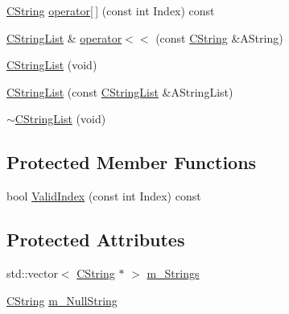 \begin{DoxyCompactItemize}
\item 
\hyperlink{classCString}{C\-String} \hyperlink{classCStringList_a8bdb9a9ae1b232214241eb3f4658bbeb}{operator\mbox{[}$\,$\mbox{]}} (const int Index) const 
\item 
\hyperlink{classCStringList}{C\-String\-List} \& \hyperlink{classCStringList_ac7af08bd93a1d622379f5e9dc54329a1}{operator$<$$<$} (const \hyperlink{classCString}{C\-String} \&A\-String)
\item 
\hyperlink{classCStringList_ac9d2195d4f6e0fa08488cb1ab98a236e}{C\-String\-List} (void)
\item 
\hyperlink{classCStringList_aa1cc8d6d2e1138e2734556e45257614d}{C\-String\-List} (const \hyperlink{classCStringList}{C\-String\-List} \&A\-String\-List)
\item 
\hyperlink{classCStringList_aa7c3df28564109982e37b0fa2d908672}{$\sim$\-C\-String\-List} (void)
\end{DoxyCompactItemize}
\subsection*{Protected Member Functions}
\begin{DoxyCompactItemize}
\item 
bool \hyperlink{classCStringList_ab98413493b1f07399ec8721db6d57389}{Valid\-Index} (const int Index) const 
\end{DoxyCompactItemize}
\subsection*{Protected Attributes}
\begin{DoxyCompactItemize}
\item 
std\-::vector$<$ \hyperlink{classCString}{C\-String} $\ast$ $>$ \hyperlink{classCStringList_a60e983669566a41d76a98122b7e9e7af}{m\-\_\-\-Strings}
\item 
\hyperlink{classCString}{C\-String} \hyperlink{classCStringList_a26d8e40b767037a4314894ebe1fcf2b0}{m\-\_\-\-Null\-String}
\end{DoxyCompactItemize}


